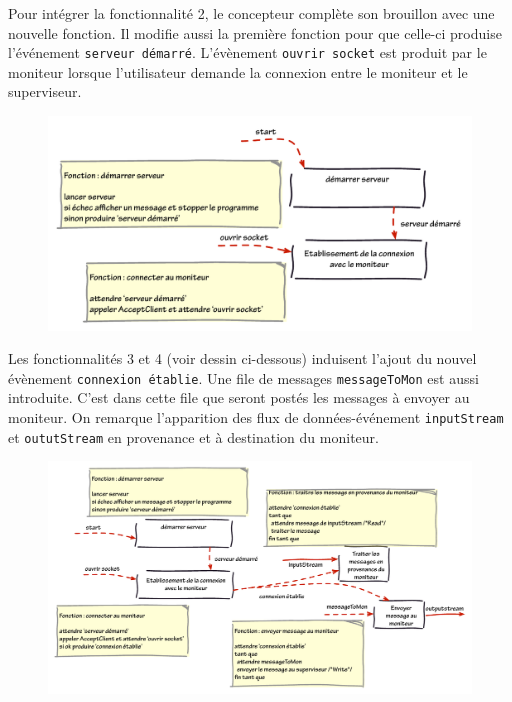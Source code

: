 \documentclass[11pt,a4paper]{paper}
\begin{document}
Pour intégrer la fonctionnalité 2, le concepteur complète son brouillon avec une nouvelle fonction. Il modifie aussi la première fonction pour que celle-ci produise l'événement {\tt serveur démarré}. L'évènement {\tt ouvrir socket} est produit par le moniteur lorsque l'utilisateur demande la connexion entre le moniteur et le superviseur.
 \begin{figure}[htbp]
\begin{center}
\includegraphics[scale=0.5]{figures_pdf/fonc/fonc2}
\end{center}
\end{figure}
\FloatBarrier

Les fonctionnalités 3 et 4 (voir dessin ci-dessous) induisent l'ajout du nouvel évènement {\tt connexion établie}. Une file de messages {\tt messageToMon} est aussi introduite. C'est dans cette file que seront postés les messages à envoyer au moniteur. On remarque l'apparition des flux de données-événement {\tt inputStream} et {\tt oututStream} en provenance et à destination du moniteur.
 \begin{figure}[htbp]
\begin{center}
\includegraphics[scale=0.5]{figures_pdf/fonc/fonc3-4}
\end{center}
\end{figure}
\FloatBarrier
\end{document}
